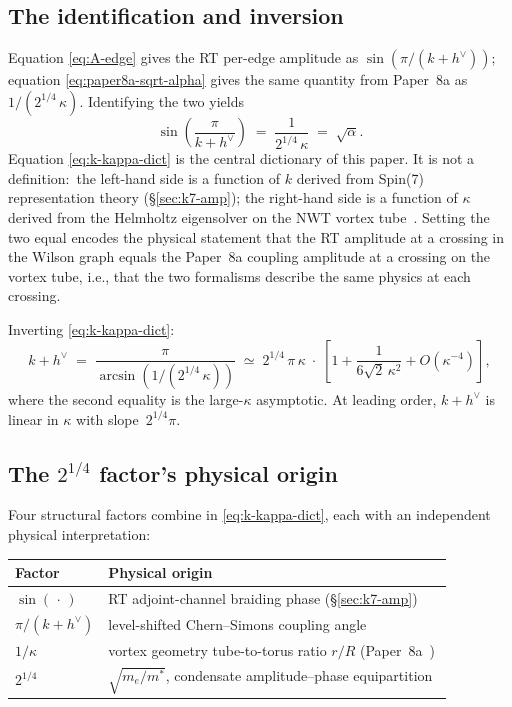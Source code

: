 \documentclass[11pt]{article}
\newcommand{\hv}{h^{\vee}}
\begin{document}
\subsection{The identification and inversion}
\label{sec:k-alpha-identification}

Equation \eqref{eq:A-edge} gives the RT per-edge amplitude as
$\sin(\pi/(k + \hv))$; equation \eqref{eq:paper8a-sqrt-alpha}
gives the same quantity from Paper~8a as
$1/(2^{1/4}\,\kappa)$.  Identifying the two yields
\begin{equation}
  \boxed{\quad
    \sin\!\left(\frac{\pi}{k + \hv}\right)
    \;=\;
    \frac{1}{2^{1/4}\,\kappa}
    \;=\; \sqrt{\alpha}.
  \quad}
  \label{eq:k-kappa-dict}
\end{equation}
Equation \eqref{eq:k-kappa-dict} is the central dictionary of
this paper.  It is not a definition:\ the left-hand side is a
function of $k$ derived from Spin(7) representation theory
(\S\ref{sec:k7-amp}); the right-hand side is a function of
$\kappa$ derived from the Helmholtz eigensolver on the NWT vortex
tube~\cite{paper8a}.  Setting the two equal encodes the physical
statement that the RT amplitude at a crossing in the Wilson graph
equals the Paper~8a coupling amplitude at a crossing on the
vortex tube, i.e., that the two formalisms describe the same
physics at each crossing.

Inverting \eqref{eq:k-kappa-dict}:
\begin{equation}
  k + \hv
  \;=\; \frac{\pi}{\arcsin\!\left(1 /(2^{1/4}\,\kappa)\right)}
  \;\simeq\; 2^{1/4}\,\pi\,\kappa
  \;\cdot\; \left[1 + \frac{1}{6\sqrt{2}\,\kappa^2} + O(\kappa^{-4})\right],
  \label{eq:k-of-kappa}
\end{equation}
where the second equality is the large-$\kappa$ asymptotic.  At
leading order, $k + \hv$ is linear in $\kappa$ with
slope~$2^{1/4}\pi$.

\subsection{The $2^{1/4}$ factor's physical origin}
\label{sec:k-alpha-sqrt2}

Four structural factors combine in \eqref{eq:k-kappa-dict}, each
with an independent physical interpretation:
\begin{center}
\begin{tabular}{ll}
\toprule
Factor & Physical origin \\
\midrule
$\sin(\,\cdot\,)$
  & RT adjoint-channel braiding phase (\S\ref{sec:k7-amp}) \\
$\pi / (k + \hv)$
  & level-shifted Chern--Simons coupling angle \\
$1/\kappa$
  & vortex geometry tube-to-torus ratio $r/R$
  (Paper~8a~\cite{paper8a}) \\
$2^{1/4}$
  & $\sqrt{m_e / m^*}$, condensate amplitude--phase
  equipartition~\cite{paper5,paper8a} \\
\bottomrule
\end{tabular}
\end{center}
\end{document}
